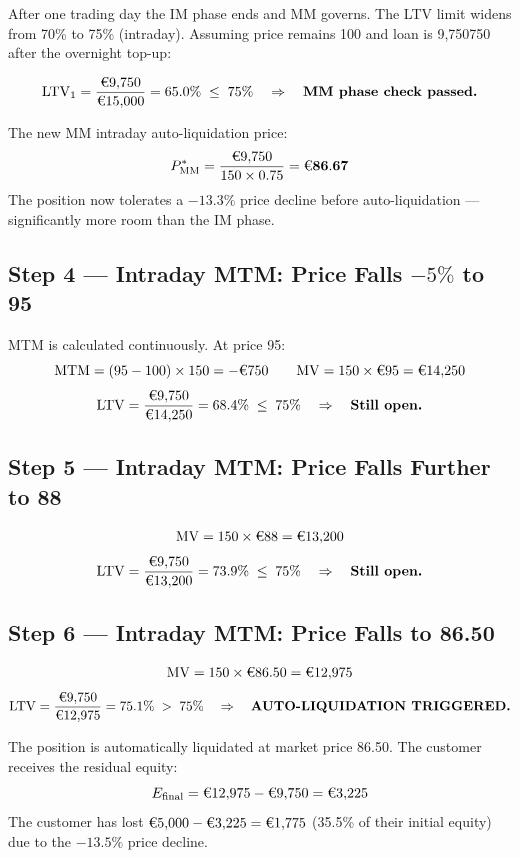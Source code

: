 \documentclass[9pt, a4paper]{extarticle}
\newcommand{\EUR}[1]{\ifmmode\text{\texteuro}#1\else\texteuro#1\fi}
\begin{document}
After one trading day the IM phase ends and MM governs. The LTV limit widens from
70\% to 75\% (intraday). Assuming price remains \EUR{100} and loan is \EUR{9{,}750}
after the overnight top-up:

\[
    \mathrm{LTV}_1 = \frac{\EUR{9{,}750}}{\EUR{15{,}000}} = 65.0\%
    \;\leq\; 75\%
    \quad\Rightarrow\quad \textbf{MM phase check passed.}
\]

The new MM intraday auto-liquidation price:
\[
    P^{*}_{\mathrm{MM}} = \frac{\EUR{9{,}750}}{150 \times 0.75} = \mathbf{\EUR{86.67}}
\]
The position now tolerates a $-13.3\%$ price decline before auto-liquidation — significantly
more room than the IM phase.

\subsection{Step 4 — Intraday MTM: Price Falls $-5\%$ to \EUR{95}}

MTM is calculated continuously. At price \EUR{95}:
\[
    \mathrm{MTM} = (95 - 100) \times 150 = -\EUR{750}
    \qquad
    \mathrm{MV} = 150 \times \EUR{95} = \EUR{14{,}250}
\]
\[
    \mathrm{LTV} = \frac{\EUR{9{,}750}}{\EUR{14{,}250}} = 68.4\%
    \;\leq\; 75\%
    \quad\Rightarrow\quad \textbf{Still open.}
\]

\subsection{Step 5 — Intraday MTM: Price Falls Further to \EUR{88}}

\[
    \mathrm{MV} = 150 \times \EUR{88} = \EUR{13{,}200}
\]
\[
    \mathrm{LTV} = \frac{\EUR{9{,}750}}{\EUR{13{,}200}} = 73.9\%
    \;\leq\; 75\%
    \quad\Rightarrow\quad \textbf{Still open.}
\]

\subsection{Step 6 — Intraday MTM: Price Falls to \EUR{86.50}}

\[
    \mathrm{MV} = 150 \times \EUR{86.50} = \EUR{12{,}975}
\]
\[
    \mathrm{LTV} = \frac{\EUR{9{,}750}}{\EUR{12{,}975}} = 75.1\%
    \;>\; 75\%
    \quad\Rightarrow\quad \textbf{AUTO-LIQUIDATION TRIGGERED.}
\]

The position is automatically liquidated at market price \EUR{86.50}. The customer
receives the residual equity:
\[
    E_{\mathrm{final}} = \EUR{12{,}975} - \EUR{9{,}750} = \EUR{3{,}225}
\]
The customer has lost $\EUR{5{,}000} - \EUR{3{,}225} = \EUR{1{,}775}$ (35.5\% of their
initial equity) due to the $-13.5\%$ price decline.
\end{document}
